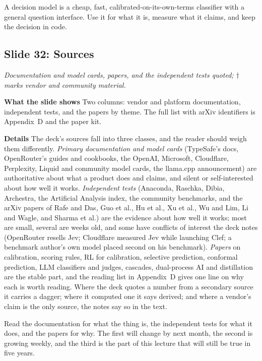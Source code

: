 \documentclass[11pt,letterpaper]{article}
\newcommand{\setstage}[1]{\colorlet{stagec}{#1}}
\newcommand{\slide}[3]{%
  \subsection[Slide #1: #2]{Slide #1: #2}%
  {\color{muted}\itshape #3\par}\medskip}
\newcommand{\para}[1]{\medskip\noindent\textbf{#1}\quad}
\newenvironment{intuition}{\begin{tcolorbox}[intuitionbox]}{\end{tcolorbox}}
\begin{document}
\begin{intuition}
A decision model is a cheap, fast, calibrated-on-its-own-terms classifier with a general question interface. Use it for what it is, measure what it claims, and keep the decision in code.
\end{intuition}

\slide{32}{Sources}{Documentation and model cards, papers, and the independent tests quoted; $\dagger$ marks vendor and community material.}

\para{What the slide shows} Two columns: vendor and platform documentation, independent tests, and the papers by theme. The full list with arXiv identifiers is Appendix~D and the paper kit.

\para{Details} The deck's sources fall into three classes, and the reader should weigh them differently. \emph{Primary documentation and model cards} (TypeSafe's docs, OpenRouter's guides and cookbooks, the OpenAI, Microsoft, Cloudflare, Perplexity, Liquid and community model cards, the llama.cpp announcement) are authoritative about what a product does and claims, and silent or self-interested about how well it works. \emph{Independent tests} (Anaconda, Raschka, Dibia, Archestra, the Artificial Analysis index, the community benchmarks, and the arXiv papers of Rafe and Das, Guo et al., Hu et al., Xu et al., Wu and Lim, Li and Wagle, and Sharma et al.) are the evidence about how well it works; most are small, several are weeks old, and some have conflicts of interest the deck notes (OpenRouter resells Jev; Cloudflare measured Jev while launching Clef; a benchmark author's own model placed second on his benchmark). \emph{Papers} on calibration, scoring rules, RL for calibration, selective prediction, conformal prediction, LLM classifiers and judges, cascades, dual-process AI and distillation are the stable part, and the reading list in Appendix~D gives one line on why each is worth reading. Where the deck quotes a number from a secondary source it carries a dagger; where it computed one it says derived; and where a vendor's claim is the only source, the notes say so in the text.

\begin{intuition}
Read the documentation for what the thing is, the independent tests for what it does, and the papers for why. The first will change by next month, the second is growing weekly, and the third is the part of this lecture that will still be true in five years.
\end{intuition}
\clearpage
\appendix
\setstage{ink}
\end{document}
